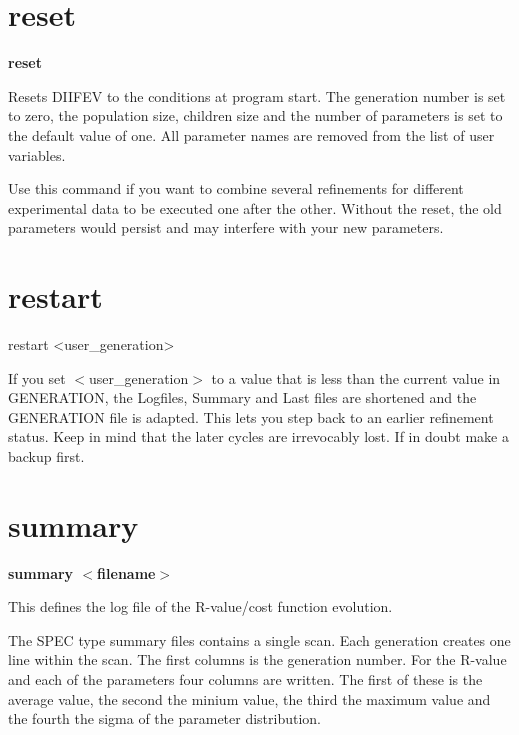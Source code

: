 \section{reset}
{\bf reset \par }
\par
\vspace{3pt}
Resets DIIFEV to the conditions at program start. The generation 
number is set to zero, the population size, children size and the 
number of parameters is set to the default value of one. All parameter 
names are removed from the list of user variables. 
\par
Use this command if you want to combine several refinements 
for different experimental data to be executed one after the other. 
Without the reset, the old parameters would persist and may 
interfere with your new parameters. 
\section{restart}
\begin{MacVerbatim}
restart <user_generation>
\end{MacVerbatim}
If you set $ <$user\_generation$> $ to a value that is less than 
the current value in GENERATION, 
the Logfiles, Summary and Last files are 
shortened and the GENERATION file is adapted. 
This lets you step back to an earlier refinement status. 
Keep in mind that the later cycles are irrevocably lost. 
If in doubt make a backup first. 
\section{summary}
{\bf summary $ <$filename$> $ \par }
\par
\vspace{3pt}
This defines the log file of the R-value/cost function evolution. 
\par
The SPEC type summary files contains a single scan. Each generation 
creates one line within the scan. The first columns is the generation 
number. For the R-value and each of the parameters four columns are 
written. The first of these is the average value, the second the 
minium value, the third the maximum value and the fourth the sigma of 
the parameter distribution. 
